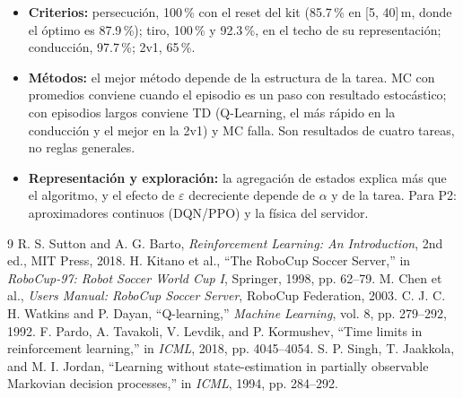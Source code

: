 \documentclass[11pt,a4paper]{article}
\begin{document}
\begin{itemize}
    \item \textbf{Criterios:} persecución, 100\,\% con el reset del kit (85.7\,\% en [5, 40]\,m, donde el óptimo es
    87.9\,\%); tiro, 100\,\% y 92.3\,\%, en el techo de su representación; conducción, 97.7\,\%; 2v1, 65\,\%.
    \item \textbf{Métodos:} el mejor método depende de la estructura de la tarea. MC con promedios conviene cuando el
    episodio es un paso con resultado estocástico; con episodios largos conviene TD (Q-Learning, el más rápido en la
    conducción y el mejor en la 2v1) y MC falla. Son resultados de cuatro tareas, no reglas generales.
    \item \textbf{Representación y exploración:} la agregación de estados explica más que el algoritmo, y el efecto de
    $\varepsilon$ decreciente depende de $\alpha$ y de la tarea. Para P2: aproximadores continuos (DQN/PPO) y la
    física del servidor.
\end{itemize}

{\footnotesize
\begin{thebibliography}{9}
R. S. Sutton and A. G. Barto, \textit{Reinforcement Learning: An Introduction}, 2nd ed., MIT Press, 2018.
H. Kitano et al., ``The RoboCup Soccer Server,'' in \textit{RoboCup-97: Robot Soccer World Cup I}, Springer, 1998, pp. 62--79.
M. Chen et al., \textit{Users Manual: RoboCup Soccer Server}, RoboCup Federation, 2003.
C. J. C. H. Watkins and P. Dayan, ``Q-learning,'' \textit{Machine Learning}, vol. 8, pp. 279--292, 1992.
F. Pardo, A. Tavakoli, V. Levdik, and P. Kormushev, ``Time limits in reinforcement learning,'' in \textit{ICML}, 2018, pp. 4045--4054.
S. P. Singh, T. Jaakkola, and M. I. Jordan, ``Learning without state-estimation in partially observable Markovian decision processes,'' in \textit{ICML}, 1994, pp. 284--292.
\end{thebibliography}
}
\end{document}
